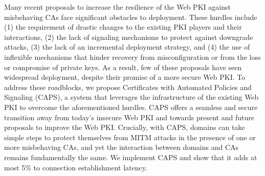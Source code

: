 Many recent proposals to increase the resilience of the Web PKI against
misbehaving CAs face significant obstacles to deployment. These hurdles include
(1) the requirement of drastic changes to the existing PKI players and their
interactions, (2) the lack of signaling mechanisms to protect against
downgrade attacks, (3) the lack of an incremental deployment strategy, and (4)
the use of inflexible mechanisms that hinder recovery from misconfiguration or
from the loss or compromise of private keys.  As a result, few of these
proposals have seen widespread deployment, despite their promise of a more
secure Web PKI.  To address these roadblocks, we propose Certificates with
Automated Policies and Signaling (CAPS), a system that leverages the
infrastructure of the existing Web PKI to overcome the aforementioned hurdles.
CAPS offers a seamless and secure transition away from today's insecure Web PKI
and towards present and future proposals to improve the Web PKI.  Crucially,
with CAPS, domains can take simple steps to protect themselves from MITM
attacks in the presence of one or more misbehaving CAs, and yet the interaction
between domains and CAs remains fundamentally the same.  We implement CAPS and
show that it adds at most 5\% to connection establishment latency. 
